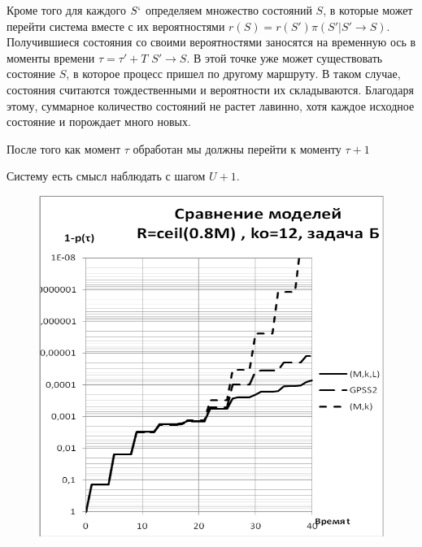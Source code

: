 Кроме того для каждого $S`$ определяем множество состояний $S$, в которые может перейти система вместе с их вероятностями $r(S)=r(S')\pi(S'|S' \to S)$. Получившиеся состояния со своими вероятностями заносятся на временную ось в моменты времени $\tau = \tau' + T$ $S' \to S$. В этой точке уже может существовать состояние $S$, в которое процесс пришел по другому маршруту. В таком случае, состояния считаются тождественными и вероятности их складываются. Благодаря этому, суммарное количество состояний не растет лавинно, хотя каждое исходное состояние и порождает много новых.

После того как момент $\tau$ обработан мы должны перейти к моменту $\tau+1$

Систему есть смысл наблюдать с шагом $U+1$.
\begin{figure}[h]
\includegraphics[width=\textwidth]{Wimedia2.pdf}
\end{figure}
